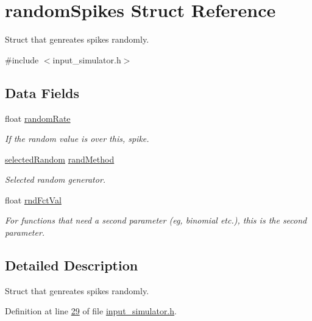 \hypertarget{structrandom_spikes}{}\section{random\+Spikes Struct Reference}
\label{structrandom_spikes}


Struct that genreates spikes randomly.  




{\ttfamily \#include $<$input\+\_\+simulator.\+h$>$}

\subsection*{Data Fields}
\begin{DoxyCompactItemize}
\item 
float \hyperlink{structrandom_spikes_a1333eb5695ae83d1ffccf24b08bc6288}{random\+Rate}
\begin{DoxyCompactList}\small\item\em If the random value is over this, spike. \end{DoxyCompactList}\item 
\hyperlink{input__simulator_8h_aa0d25534cd73156287b1136dd89c0215}{selected\+Random} \hyperlink{structrandom_spikes_a18766f12fc4212349fb61b221f83b779}{rand\+Method}
\begin{DoxyCompactList}\small\item\em Selected random generator. \end{DoxyCompactList}\item 
float \hyperlink{structrandom_spikes_a0eb8199754a403ccc8eac256f9193a02}{rnd\+Fct\+Val}
\begin{DoxyCompactList}\small\item\em For functions that need a second parameter (eg, binomial etc.), this is the second parameter. \end{DoxyCompactList}\end{DoxyCompactItemize}


\subsection{Detailed Description}
Struct that genreates spikes randomly. 



Definition at line \hyperlink{input__simulator_8h_source_l00029}{29} of file \hyperlink{input__simulator_8h_source}{input\+\_\+simulator.\+h}.




